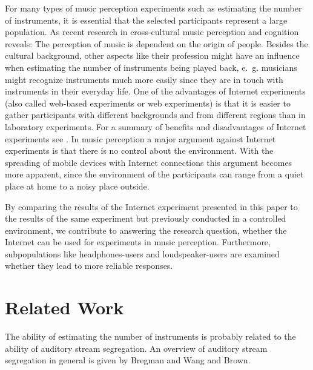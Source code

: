For many types of music perception experiments such as estimating the number of instruments, it is essential that the selected participants represent a large population. As recent research in cross-cultural music perception and cognition reveals: The perception of music is dependent on the origin of people\cite{Stevens2012}. Besides the cultural background, other aspects like their profession might have an influence when estimating the number of instruments being played back, e.~g. musicians might recognize instruments much more easily since they are in touch with instruments in their everyday life. One of the advantages of Internet experiments (also called web-based experiments or web experiments) is that it is easier to gather participants with different backgrounds and from different regions than in laboratory experiments. For a summary of benefits and disadvantages of Internet experiments see \cite{Reips2002}. In music perception a major argument against Internet experiments is that there is no control about the environment. With the spreading of mobile devices with Internet connections this argument becomes more apparent, since the environment of the participants can range from a quiet place at home to a noisy place outside.

By comparing the results of the Internet experiment presented in this paper to the results of the same experiment but previously conducted in a controlled environment\cite{Stoter2013}, we contribute to answering the research question, whether the Internet can be used for experiments in music perception. Furthermore, subpopulations like headphones-users and loudspeaker-users are examined whether they lead to more reliable responses.

\section{Related Work}\label{sec:related_work}
The ability of estimating the number of instruments is probably related to the ability of auditory stream segregation. An overview of auditory stream segregation in general is given by Bregman\cite{bregman90} and Wang and Brown\cite{wang2006}.

